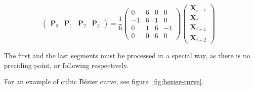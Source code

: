 $$
\begin{pmatrix}\mathbf{P}_0 & \mathbf{P}_1 & \mathbf{P}_{2} & \mathbf{P}_{3} \end{pmatrix} = \frac{1}{6}\begin{pmatrix} 0 & 6 & 0 & 0 \\ -1 & 6 & 1 & 0 \\ 0 & 1 & 6 & -1 \\ 0 & 0 & 6 & 0 \end{pmatrix} \begin{pmatrix} \mathbf{X}_{i-1} \\ \mathbf{X}_i \\ \mathbf{X}_{i+1} \\ \mathbf{X}_{i+2} \end{pmatrix}
$$

The first and the last segments must be processed in a special way, as there is no preciding point, or following respectively. 

For an example of cubic Bézier curve, see figure~\ref{fig:bezier-curve}.
